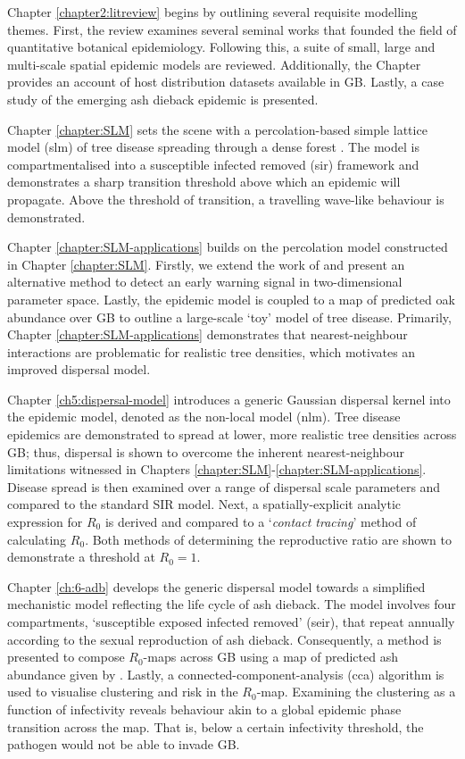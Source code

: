 Chapter \ref{chapter2:litreview} begins by outlining several requisite modelling themes. First, the review examines
several seminal works that founded the field of quantitative botanical epidemiology. Following this,
a suite of small, large and multi-scale spatial epidemic models are reviewed. Additionally,
the Chapter provides an account of host distribution datasets available in GB. Lastly, a case study of the emerging
ash dieback epidemic is presented.

Chapter \ref{chapter:SLM} sets the scene with a percolation-based simple lattice model (\acrshort{slm}) of tree
disease spreading through a dense forest \cite{OROZCOFUENTES201912}. The model is compartmentalised
into a susceptible infected removed (\acrshort{sir}) framework and demonstrates a sharp transition threshold above which an epidemic will propagate. 
Above the threshold of transition, a travelling wave-like behaviour is demonstrated.

Chapter \ref{chapter:SLM-applications} builds on the percolation model constructed in Chapter \ref{chapter:SLM}.
Firstly, we extend the work of \cite{OROZCOFUENTES201912} and present an alternative method to detect an early
warning signal in two-dimensional parameter space. Lastly, the epidemic model is coupled to a map of predicted
oak abundance over GB \cite{hill.data} to outline a large-scale `toy' model of tree disease. 
Primarily, Chapter \ref{chapter:SLM-applications} demonstrates that nearest-neighbour interactions are problematic
for realistic tree densities, which motivates an improved dispersal model. 

Chapter \ref{ch5:dispersal-model} introduces a generic Gaussian dispersal kernel into the epidemic model, denoted as the non-local model (\acrshort{nlm}). 
Tree disease epidemics are demonstrated to spread at lower, more realistic tree densities across GB; thus, dispersal is shown to overcome 
the inherent nearest-neighbour limitations witnessed in Chapters \ref{chapter:SLM}-\ref{chapter:SLM-applications}. Disease spread is then examined over a range of dispersal scale parameters and compared to the standard SIR model. Next, a spatially-explicit analytic expression for $R_0$ is derived and compared to a `\textit{contact tracing}' method of calculating $R_0$.
Both methods of determining the reproductive ratio are shown to demonstrate a threshold at $R_0=1$.

Chapter \ref{ch:6-adb} develops the generic dispersal model towards a simplified mechanistic
model reflecting the life cycle of ash dieback. The model involves four compartments, `susceptible exposed infected removed' (\acrshort{seir}), that repeat
annually according to the sexual reproduction of ash dieback. Consequently, a method is presented to compose $R_0$-maps
across GB using a map of predicted ash abundance given by \cite{hill.data}. Lastly, a connected-component-analysis
(\acrshort{cca}) algorithm is used to visualise  clustering and risk in the $R_0$-map. Examining the clustering as a function
of infectivity reveals behaviour akin to a global epidemic phase transition across the map. That is, below a certain infectivity threshold, 
the pathogen would not be able to invade GB.

